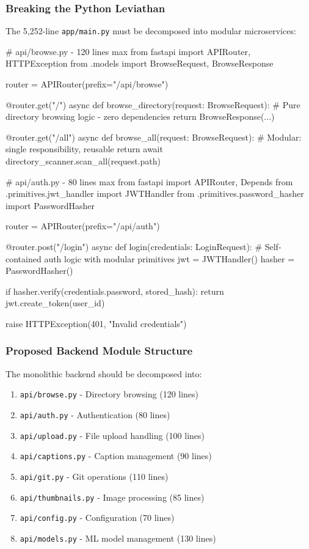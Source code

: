 \documentclass[11pt]{article}
\begin{document}
\subsubsection{Breaking the Python Leviathan}

The 5,252-line \texttt{app/main.py} must be decomposed into modular microservices:

\begin{typescriptcode}
# api/browse.py - 120 lines max
from fastapi import APIRouter, HTTPException
from .models import BrowseRequest, BrowseResponse

router = APIRouter(prefix="/api/browse")

@router.get("/")
async def browse_directory(request: BrowseRequest):
    # Pure directory browsing logic - zero dependencies
    return BrowseResponse(...)

@router.get("/all")
async def browse_all(request: BrowseRequest):
    # Modular: single responsibility, reusable
    return await directory_scanner.scan_all(request.path)
\end{typescriptcode}

\begin{typescriptcode}
# api/auth.py - 80 lines max  
from fastapi import APIRouter, Depends
from .primitives.jwt_handler import JWTHandler
from .primitives.password_hasher import PasswordHasher

router = APIRouter(prefix="/api/auth")

@router.post("/login")
async def login(credentials: LoginRequest):
    # Self-contained auth logic with modular primitives
    jwt = JWTHandler()
    hasher = PasswordHasher()
    
    if hasher.verify(credentials.password, stored_hash):
        return jwt.create_token(user_id)
    
    raise HTTPException(401, "Invalid credentials")
\end{typescriptcode}

\subsubsection{Proposed Backend Module Structure}

The monolithic backend should be decomposed into:

\begin{enumerate}
\item \texttt{api/browse.py} - Directory browsing (120 lines)
\item \texttt{api/auth.py} - Authentication (80 lines)
\item \texttt{api/upload.py} - File upload handling (100 lines)
\item \texttt{api/captions.py} - Caption management (90 lines)
\item \texttt{api/git.py} - Git operations (110 lines)
\item \texttt{api/thumbnails.py} - Image processing (85 lines)
\item \texttt{api/config.py} - Configuration (70 lines)
\item \texttt{api/models.py} - ML model management (130 lines)
\end{enumerate}
\end{document}
